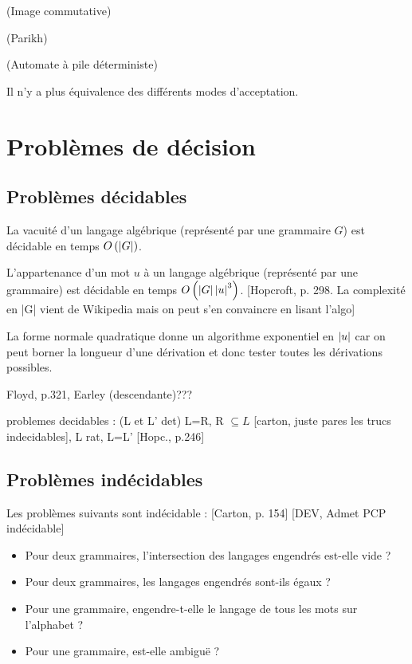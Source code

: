 \documentclass[../../agregation.tex]{subfiles}
\begin{document}
\begin{defn}
	(Image commutative)\end{defn}
\begin{thm}
	(Parikh)
\end{thm}


\begin{defn}
	(Automate à pile déterministe)\end{defn}
\begin{rem}
	Il n'y a plus équivalence des différents modes d'acceptation.
\end{rem}


\section{Problèmes de décision}

\subsection{Problèmes décidables}
\begin{thm}
	La vacuité d'un langage algébrique (représenté par une grammaire $G$)
	est décidable en temps $O\left(\left|G\right|\right)$.
\end{thm}

\begin{thm}
	L'appartenance d'un mot $u$ à un langage algébrique (représenté par
	une grammaire) est décidable en temps $O\left(\left|G\right|\left|u\right|^{3}\right)$.
	{[}Hopcroft, p. 298. La complexité en |G| vient de Wikipedia mais
	on peut s'en convaincre en lisant l'algo{]}\end{thm}
\begin{rem}
	La forme normale quadratique donne un algorithme exponentiel en $\left|u\right|$
	car on peut borner la longueur d'une dérivation et donc tester toutes
	les dérivations possibles.\\
	
\end{rem}
Floyd, p.321, Earley (descendante)???

problemes decidables : (L et L' det) L=R, R $\subseteq L$ {[}carton,
juste pares les trucs indecidables{]}, L rat, L=L' {[}Hopc., p.246{]}


\subsection{Problèmes indécidables}
\begin{prop}
	Les problèmes suivants sont indécidable : {[}Carton, p. 154{]} {[}DEV,
	Admet PCP indécidable{]}
	\begin{itemize}
		\item Pour deux grammaires, l'intersection des langages engendrés est-elle
		vide ?
		\item Pour deux grammaires, les langages engendrés sont-ils égaux ?
		\item Pour une grammaire, engendre-t-elle le langage de tous les mots sur
		l'alphabet ?
		\item Pour une grammaire, est-elle ambiguë ?
	\end{itemize}
\end{prop}
\end{document}
